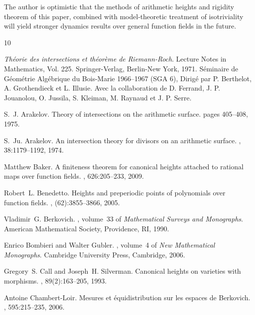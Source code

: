 \documentclass[times, doublespace]{amsart}
\numberwithin{equation}{section}
\theoremstyle{plain}
\theoremstyle{definition}
\begin{document}
The author is optimistic that the methods of arithmetic heights and rigidity theorem of this paper, combined with model-theoretic treatment of isotriviality will yield stronger dynamics results over general function fields in the future.





\begin{thebibliography}{10}

{\em Th\'eorie des intersections et th\'eor\`eme de {R}iemann-{R}och}.
\newblock Lecture Notes in Mathematics, Vol. 225. Springer-Verlag, Berlin-New
  York, 1971.
\newblock S\'eminaire de G\'eom\'etrie Alg\'ebrique du Bois-Marie 1966--1967
  (SGA 6), Dirig\'e par P. Berthelot, A. Grothendieck et L. Illusie. Avec la
  collaboration de D. Ferrand, J. P. Jouanolou, O. Jussila, S. Kleiman, M.
  Raynaud et J. P. Serre.

S.~J. Arakelov.
\newblock Theory of intersections on the arithmetic surface.
\newblock pages 405--408, 1975.

S.~Ju. Arakelov.
\newblock An intersection theory for divisors on an arithmetic surface.
, 38:1179--1192, 1974.

Matthew Baker.
\newblock A finiteness theorem for canonical heights attached to rational maps
  over function fields.
, 626:205--233, 2009.

Robert~L. Benedetto.
\newblock Heights and preperiodic points of polynomials over function fields.
, (62):3855--3866, 2005.

Vladimir~G. Berkovich.
, volume~33 of {\em Mathematical Surveys and Monographs}.
\newblock American Mathematical Society, Providence, RI, 1990.

Enrico Bombieri and Walter Gubler.
, volume~4 of {\em New
  Mathematical Monographs}.
\newblock Cambridge University Press, Cambridge, 2006.

Gregory~S. Call and Joseph~H. Silverman.
\newblock Canonical heights on varieties with morphisms.
, 89(2):163--205, 1993.

Antoine Chambert-Loir.
\newblock Mesures et \'equidistribution sur les espaces de {B}erkovich.
, 595:215--235, 2006.


\end{thebibliography}
\end{document}

